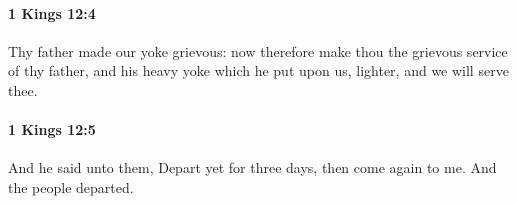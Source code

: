 		\paragraph{1 Kings 12:4} %
			\label{1KINGS-12-4}

			Thy father made our yoke grievous: now therefore make thou the grievous service of thy father, and his heavy yoke which he put upon us, lighter, and we will serve thee.


		\paragraph{1 Kings 12:5} %
			\label{1KINGS-12-5}

			And he said unto them, Depart yet for three days, then come again to me. And the people departed.


